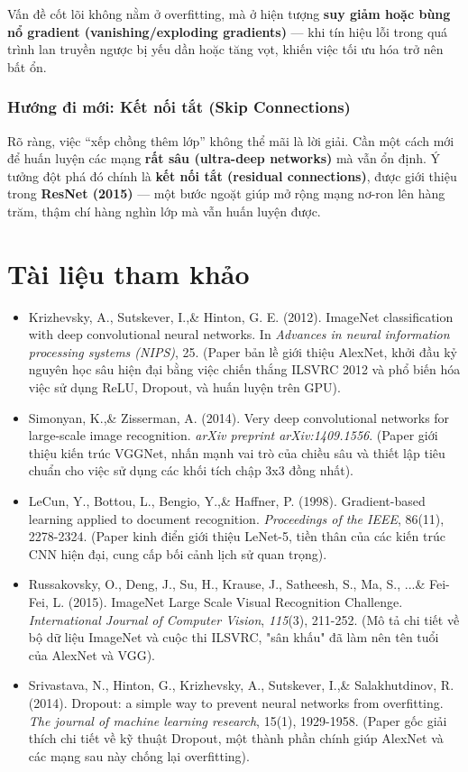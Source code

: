 Vấn đề cốt lõi không nằm ở overfitting, mà ở hiện tượng \textbf{suy giảm hoặc bùng nổ gradient (vanishing/exploding gradients)} — khi tín hiệu lỗi trong quá trình lan truyền ngược bị yếu dần hoặc tăng vọt, khiến việc tối ưu hóa trở nên bất ổn.

\subsubsection*{Hướng đi mới: Kết nối tắt (Skip Connections)}
Rõ ràng, việc “xếp chồng thêm lớp” không thể mãi là lời giải.  
Cần một cách mới để huấn luyện các mạng \textbf{rất sâu (ultra-deep networks)} mà vẫn ổn định.  
Ý tưởng đột phá đó chính là \textbf{kết nối tắt (residual connections)}, được giới thiệu trong \textbf{ResNet (2015)} — một bước ngoặt giúp mở rộng mạng nơ-ron lên hàng trăm, thậm chí hàng nghìn lớp mà vẫn huấn luyện được.


\section*{Tài liệu tham khảo}
\begin{itemize}
	\item[1] Krizhevsky, A., Sutskever, I.,\& Hinton, G. E. (2012). ImageNet classification with deep convolutional neural networks. In \textit{Advances in neural information processing systems (NIPS)}, 25. (Paper bản lề giới thiệu AlexNet, khởi đầu kỷ nguyên học sâu hiện đại bằng việc chiến thắng ILSVRC 2012 và phổ biến hóa việc sử dụng ReLU, Dropout, và huấn luyện trên GPU).
	\item[2] Simonyan, K.,\& Zisserman, A. (2014). Very deep convolutional networks for large-scale image recognition. \textit{arXiv preprint arXiv:1409.1556}. (Paper giới thiệu kiến trúc VGGNet, nhấn mạnh vai trò của chiều sâu và thiết lập tiêu chuẩn cho việc sử dụng các khối tích chập 3x3 đồng nhất).
	\item[3] LeCun, Y., Bottou, L., Bengio, Y.,\& Haffner, P. (1998). Gradient-based learning applied to document recognition. \textit{Proceedings of the IEEE}, 86(11), 2278-2324. (Paper kinh điển giới thiệu LeNet-5, tiền thân của các kiến trúc CNN hiện đại, cung cấp bối cảnh lịch sử quan trọng).
	\item[4] Russakovsky, O., Deng, J., Su, H., Krause, J., Satheesh, S., Ma, S., ...\& Fei-Fei, L. (2015). ImageNet Large Scale Visual Recognition Challenge. \textit{International Journal of Computer Vision}, \textit{115}(3), 211-252. (Mô tả chi tiết về bộ dữ liệu ImageNet và cuộc thi ILSVRC, "sân khấu" đã làm nên tên tuổi của AlexNet và VGG).
	\item[5] Srivastava, N., Hinton, G., Krizhevsky, A., Sutskever, I.,\& Salakhutdinov, R. (2014). Dropout: a simple way to prevent neural networks from overfitting. \textit{The journal of machine learning research}, 15(1), 1929-1958. (Paper gốc giải thích chi tiết về kỹ thuật Dropout, một thành phần chính giúp AlexNet và các mạng sau này chống lại overfitting).
\end{itemize}